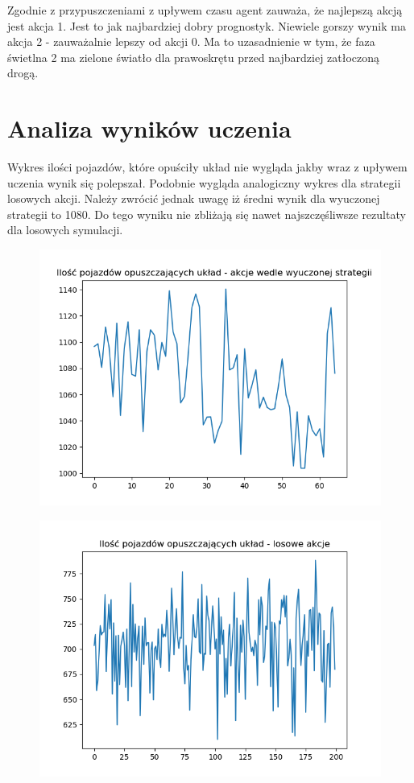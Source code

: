\documentclass[12pt]{book}
\theoremstyle{plain}
\begin{document}
	Zgodnie z przypuszczeniami z upływem czasu agent zauważa, że najlepszą akcją jest akcja 1. Jest to jak najbardziej dobry prognostyk. Niewiele gorszy wynik ma akcja 2 - zauważalnie lepszy od akcji 0. Ma to uzasadnienie w tym, że faza świetlna 2 ma zielone światło dla prawoskrętu przed najbardziej zatłoczoną drogą.


\section{Analiza wyników uczenia}	
	Wykres ilości pojazdów, które opuściły układ nie wygląda jakby wraz z upływem uczenia wynik się polepszał. Podobnie wygląda analogiczny wykres dla strategii losowych akcji. Należy zwrócić jednak uwagę iż średni wynik dla wyuczonej strategii to 1080. Do tego wyniku nie zbliżają się nawet najszczęśliwsze rezultaty dla losowych symulacji.
	
	\begin{figure}[H]
		\centering
		\includegraphics[width=13cm]{env_4_img_cars_out_policy}
		\label{fig:env_4_img_cars_out_policy}
	\end{figure}
		
	\begin{figure}[H]
		\centering
		\includegraphics[width=14cm]{env_4_img_cars_out_random}
		\label{fig:env_4_img_cars_out_random}
	\end{figure}
\end{document}

